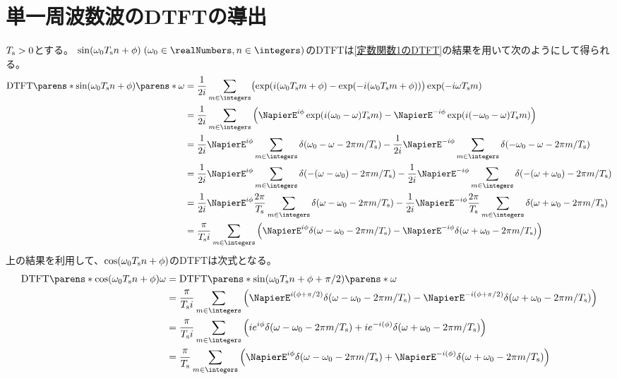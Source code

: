     \section{単一周波数波のDTFTの導出}
        $T_\text{s}>0$とする。
        $\sin(\omega_0 \Ts n + \phi)\;(\omega_0\in\realNumbers, n\in\integers)$のDTFTは\ref{定数関数1のDTFT}の結果を用いて次のようにして得られる。
        \begin{align*}
            \DTFTwithArg{\sin(\omega_0 \Ts n + \phi)}{\omega} &= \frac{1}{2i}\sum_{m\in\integers} \bigl(\exp(i(\omega_0\Ts m + \phi) - \exp(-i(\omega_0\Ts m + \phi))\bigr)\exp(-i\omega\Ts m) \\
            &= \frac{1}{2i}\sum_{m\in\integers} \left(\NapierE^{i\phi}\exp(i(\omega_0-\omega)\Ts m) - \NapierE^{-i\phi}\exp(i(-\omega_0-\omega)\Ts m)\right) \\
            &= \frac{1}{2i}\NapierE^{i\phi}\sum_{m\in\integers}\delta(\omega_0-\omega - 2\pi m/\Ts) - \frac{1}{2i}\NapierE^{-i\phi}\sum_{m\in\integers}\delta(-\omega_0-\omega - 2\pi m/\Ts) \\
            &= \frac{1}{2i}\NapierE^{i\phi}\sum_{m\in\integers}\delta(-(\omega-\omega_0) - 2\pi m/\Ts) - \frac{1}{2i}\NapierE^{-i\phi}\sum_{m\in\integers}\delta(-(\omega+\omega_0) - 2\pi m/\Ts) \\
            &= \frac{1}{2i}\NapierE^{i\phi}\frac{2\pi}{\Ts}\sum_{m\in\integers}\delta(\omega-\omega_0 - 2\pi m/\Ts) - \frac{1}{2i}\NapierE^{-i\phi}\frac{2\pi}{\Ts}\sum_{m\in\integers}\delta(\omega+\omega_0 - 2\pi m/\Ts) \\
            &= \frac{\pi}{\Ts i}\sum_{m\in\integers}\left(\NapierE^{i\phi}\delta(\omega-\omega_0 - 2\pi m/\Ts) - \NapierE^{-i\phi}\delta(\omega+\omega_0 - 2\pi m/\Ts)\right)
        \end{align*}
        上の結果を利用して、$\cos(\omega_0 T_\text{s} n + \phi)$のDTFTは次式となる。
        \begin{align*}
            \DTFT{\cos(\omega_0 \Ts n + \phi)}{\omega} &= \DTFTwithArg{\sin(\omega_0 \Ts n + \phi + \pi/2)}{\omega} \\
            &= \frac{\pi}{\Ts i}\sum_{m\in\integers}\left(\NapierE^{i(\phi+\pi/2)}\delta(\omega-\omega_0 - 2\pi m/\Ts) - \NapierE^{-i(\phi+\pi/2)}\delta(\omega+\omega_0 - 2\pi m/\Ts)\right) \\
            &= \frac{\pi}{\Ts i}\sum_{m\in\integers}\left(ie^{i\phi}\delta(\omega-\omega_0 - 2\pi m/\Ts) + ie^{-i(\phi)}\delta(\omega+\omega_0 - 2\pi m/\Ts)\right) \\
            &= \frac{\pi}{\Ts}\sum_{m\in\integers}\left(\NapierE^{i\phi}\delta(\omega-\omega_0 - 2\pi m/\Ts) + \NapierE^{-i(\phi)}\delta(\omega+\omega_0 - 2\pi m/\Ts)\right)
        \end{align*}
